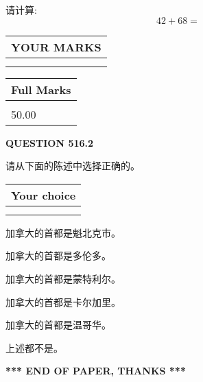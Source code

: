 \documentclass{ctexart}
\begin{document}
  
 
请计算:
\begin{equation}
42 +  %
68 = \nonumber
\end{equation}
 

 

 
  
\vspace{0.2in}
  
\noindent\begin{tabular}{|l|}
\hline
 YOUR MARKS  \\
\hline
 \\ 
 \\ 
\hline
\end{tabular}
\hspace{0.05in} \begin{tabular}{|l|}
\hline
 Full Marks  \\
\hline
 \\ 
50.00 \\
\hline
\end{tabular}
{\textbf{\Large{QUESTION
516.2 
}}}
  
  
请从下面的陈述中选择正确的。
  
  
\noindent\hspace{3.0in} \begin{tabular}{|l|}
\hline
Your choice \\
\hline
 \\ 
 \\ 
\hline
\end{tabular}
  
  
 
 
加拿大的首都是魁北克市。
 
 
加拿大的首都是多伦多。
 
 
加拿大的首都是蒙特利尔。
 
 
加拿大的首都是卡尔加里。
 
 
加拿大的首都是温哥华。
 
 
 上述都不是。
 
 
   
   
 \vspace{0.2in}
 
   
   
   
   
\vspace{1.0in} 
{\textbf{\large{ *** END OF PAPER, THANKS *** }}} 
   
\end{document}
